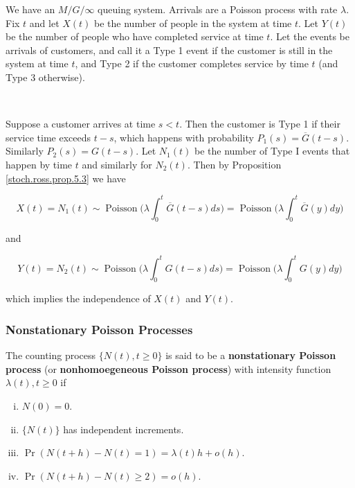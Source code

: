 \begin{example}  We have an \(M/G/\infty\) queuing system. Arrivals are a Poisson process with rate \(\lambda\). Fix \(t\) and let \(X(t)\) be the number of people in the system at time \(t\). Let \(Y(t)\) be the number of people who have completed service at time \(t\). Let the events be arrivals of customers, and call it a Type 1 event if the customer is still in the system at time \(t\), and Type 2 if the customer completes service by time \(t\) (and Type 3 otherwise).

\

Suppose a customer arrives at time \(s < t\). Then the customer is Type 1 if their service time exceeds \(t-s\), which happens with probability \(P_1(s) = \overline{G}(t-s)\). Similarly \(P_2(s) = G(t-s)\). Let \(N_1(t)\) be the number of Type I events that happen by time \(t\) and similarly for \(N_2(t)\). Then by Proposition \ref{stoch.ross.prop.5.3} we have

\[
X(t) =N_1(t) \sim \operatorname{Poisson} \bigg( \lambda \int_0^t \overline{G}(t-s) ds \bigg) =  \operatorname{Poisson} \bigg( \lambda \int_0^t \overline{G}(y) dy \bigg)
\]

and

\[
Y(t) = N_2(t) \sim  \operatorname{Poisson} \bigg( \lambda \int_0^t G(t-s) ds \bigg) =  \operatorname{Poisson} \bigg( \lambda \int_0^t G(y) dy \bigg)
\]

which implies the independence of \(X(t)\) and \(Y(t)\).
\end{example}

\subsubsection{Nonstationary Poisson Processes}

\begin{definition}\label{stoch.nonstat.pois.proc.def.ross} The counting process \(\{N(t), t \geq 0\}\) is said to be a \textbf{nonstationary Poisson process} (or \textbf{nonhomoegeneous Poisson process}) with intensity function \(\lambda(t), t \geq 0\) if

\begin{enumerate}[(i)]

\item \(N(0)= 0\).

\item \(\{N(t)\}\) has independent increments.

\item \(\Pr(N(t+h) -N(t) = 1) = \lambda(t) h + o(h) \).

\item \(\Pr(N(t+h) -N(t) \geq 2) =  o(h) \).

\end{enumerate}

\end{definition}

